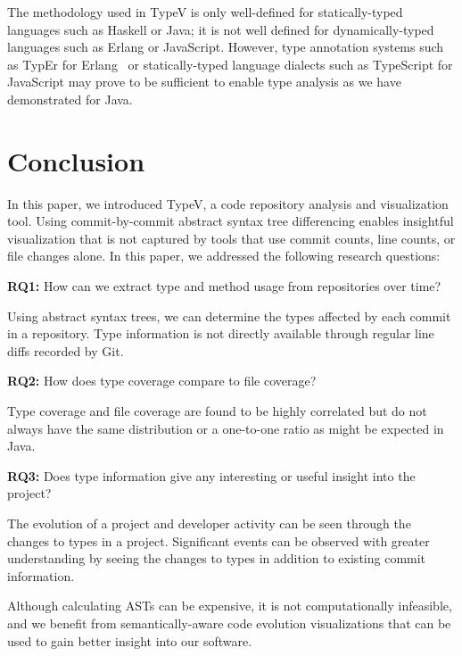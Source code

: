 The methodology used in TypeV is only well-defined for statically-typed languages such as Haskell or Java; it is not well defined for dynamically-typed languages such as Erlang or JavaScript. However, type annotation systems such as TypEr for Erlang~\cite{typer} or statically-typed language dialects such as TypeScript for JavaScript may prove to be sufficient to enable type analysis as we have demonstrated for Java.

\section{Conclusion}

In this paper, we introduced TypeV, a code repository analysis and visualization tool. Using commit-by-commit abstract syntax tree differencing enables insightful visualization that is not captured by tools that use commit counts, line counts, or file changes alone. In this paper, we addressed the following research questions:

\textbf{RQ1:} How can we extract type and method usage from repositories over time?

\begin{framed}
\noindent
Using abstract syntax trees, we can determine the types affected by each commit in a repository. Type information is not directly available through regular line diffs recorded by Git.
\end{framed}

\textbf{RQ2:} How does type coverage compare to file coverage?

\begin{framed}
\noindent
Type coverage and file coverage are found to be highly correlated but do not always have the same distribution or a one-to-one ratio as might be expected in Java.
\end{framed}

\textbf{RQ3:} Does type information give any interesting or useful insight into the project?

\begin{framed}
\noindent
The evolution of a project and developer activity can be seen through the changes to types in a project. Significant events can be observed with greater understanding by seeing the changes to types in addition to existing commit information.
\end{framed}

Although calculating ASTs can be expensive, it is not computationally infeasible, and we benefit from semantically-aware code evolution visualizations that can be used to gain better insight into our software.




